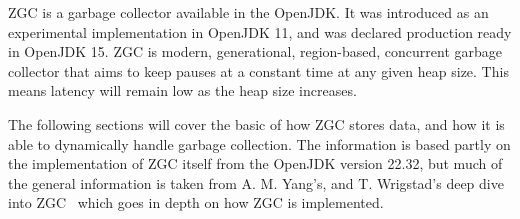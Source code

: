 
ZGC is a garbage collector available in the OpenJDK. It was introduced as an experimental implementation in OpenJDK 11, and was declared production ready in OpenJDK 15. ZGC is modern, generational, region-based, concurrent garbage collector that aims to keep pauses at a constant time at any given heap size. This means latency will remain low as the heap size increases.

The following sections will cover the basic of how ZGC stores data, and how it is able to dynamically handle garbage collection. The information is based partly on the implementation of ZGC itself from the OpenJDK version 22.32, but much of the general information is taken from A. M. Yang's, and T. Wrigstad's deep dive into ZGC~\cite{zgc:deep_dive} which goes in depth on how ZGC is implemented.

